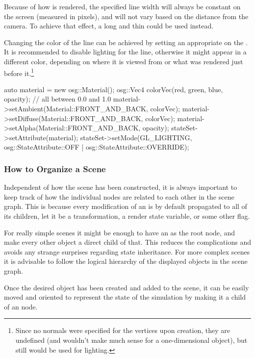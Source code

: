 Because of how  is rendered, the specified line width
will always be constant on the screen (measured in pixels), and will not vary
based on the distance from the camera. To achieve that effect, a long and thin
 could be used instead.

Changing the color of the line can be achieved by setting an appropriate
 on the . It is recommended to
disable lighting for the line, otherwise it might appear in a different color,
depending on where it is viewed from or what was rendered just before
it.\footnote{Since no normals were specified for the vertices upon creation,
they are undefined (and wouldn't make much sense for a one-dimensional object),
but still would be used for lighting.}

\begin{cpp}
auto material = new osg::Material();
osg::Vec4 colorVec(red, green, blue, opacity); // all between 0.0 and 1.0
material->setAmbient(Material::FRONT_AND_BACK, colorVec);
material->setDiffuse(Material::FRONT_AND_BACK, colorVec);
material->setAlpha(Material::FRONT_AND_BACK, opacity);
stateSet->setAttribute(material);
stateSet->setMode(GL_LIGHTING,
            osg::StateAttribute::OFF | osg::StateAttribute::OVERRIDE);
\end{cpp}

\subsubsection{How to Organize a Scene}
\label{sec:graphics:osg-organizing-a-scene}

Independent of how the scene has been constructed, it is always important
to keep track of how the individual nodes are related to each other in the
scene graph. This is because every modification of an  is by
default propagated to all of its children, let it be a transformation, a
render state variable, or some other flag.

For really simple scenes it might be enough to have an  as the
root node, and make every other object a direct child of that. This reduces
the complications and avoids any strange surprises regarding state
inheritance. For more complex scenes it is advisable to follow the logical
hierarchy of the displayed objects in the scene graph.

Once the desired object has been created and added to the scene, it can be easily
moved and oriented to represent the state of the simulation by making it a
child of an  node.


